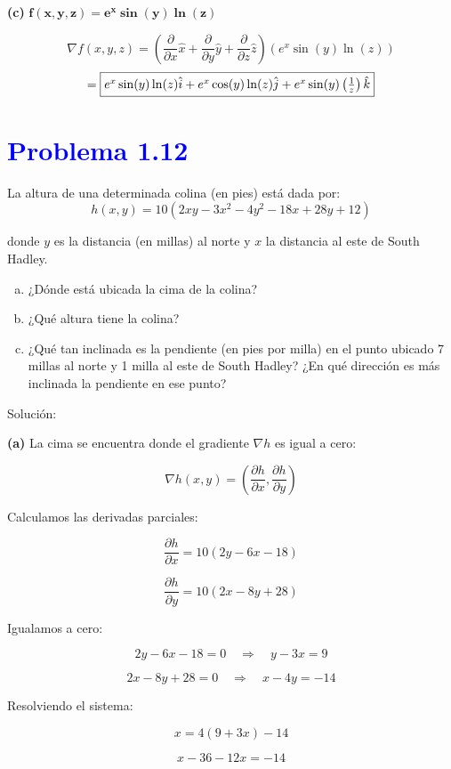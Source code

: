 \documentclass[12pt]{article}
\newcommand{\question}[1]{\textcolor{blue}{\textbf{#1}}}
\begin{document}
\textbf{(c) } \( \mathbf{f(x,y,z) = e^x \sin(y) \ln(z)} \)

\[
\nabla f(x, y, z) = \left( \frac{\partial}{\partial x} \hat{x} + \frac{\partial}{\partial y} \hat{y} + \frac{\partial}{\partial z} \hat{z} \right) \left( e^x \sin(y) \ln(z) \right)
\]
\[
 = \fbox{$ e^x \sin(y) \ln(z) \hat{i} + e^x \cos(y) \ln(z) \hat{j} + e^x \sin(y) \left( \frac{1}{z} \right) \hat{k} $}
\]



\section*{\question{Problema 1.12}} La altura de una determinada colina (en pies) está dada por:
\[
h(x,y) = 10 \left( 2xy - 3x^2 - 4y^2 - 18x + 28y + 12 \right)
\]

donde \( y \) es la distancia (en millas) al norte y \( x \) la distancia al este de South Hadley.

\begin{enumerate}[(a)]
    \item ¿Dónde está ubicada la cima de la colina?
    \item ¿Qué altura tiene la colina?
    \item ¿Qué tan inclinada es la pendiente (en pies por milla) en el punto ubicado 7 millas al norte y 1 milla al este de South Hadley? ¿En qué dirección es más inclinada la pendiente en ese punto?
\end{enumerate}

Solución: 

\textbf{(a)}
La cima se encuentra donde el gradiente \( \nabla h \) es igual a cero:

\[\nabla h(x,y) = \left( \frac{\partial h}{\partial x}, \frac{\partial h}{\partial y} \right)\]

Calculamos las derivadas parciales:

\[\frac{\partial h}{\partial x} = 10 (2y - 6x - 18)\]

\[\frac{\partial h}{\partial y} = 10 (2x - 8y + 28)\]

Igualamos a cero:

\[2y - 6x - 18 = 0 \quad \Rightarrow \quad y - 3x = 9\]

\[2x - 8y + 28 = 0 \quad \Rightarrow \quad x - 4y = -14\]

Resolviendo el sistema:

\[x = 4(9 + 3x) - 14\]

\[x - 36 - 12x = -14\]
\end{document}

